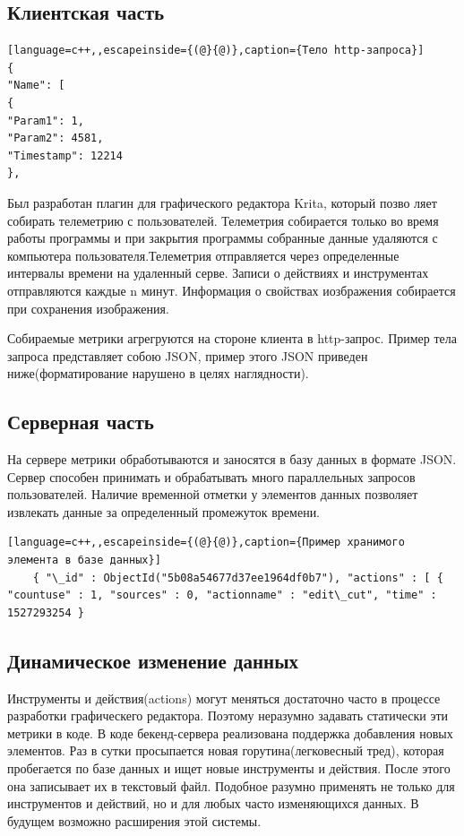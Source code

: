 \subsection{Клиентская часть}
\begin{lstlisting}[language=c++,,escapeinside={(@}{@)},caption={Тело http-запроса}] 
{
"Name": [
{
"Param1": 1,
"Param2": 4581,
"Timestamp": 12214
},
\end{lstlisting}
Был разработан плагин для графического редактора Krita, который позво­
ляет собирать телеметрию с пользователей. Телеметрия собирается только во время работы программы и при закрытия программы собранные данные удаляются с компьютера пользователя.Телеметрия отправляется через опре­деленные интервалы времени на удаленный серве. Записи о действиях и инстру­ментах отправляются каждые n минут.	   Информация о свойствах иозбражения собирается при сохранения изображения. 


Собираемые метрики агрегруются на стороне клиента в http-запрос. Пример тела запроса представляет собою JSON, пример этого JSON приведен ниже(форматирование нарушено в целях наглядности).

\subsection{Серверная часть}
На сервере метрики обработываются и заносятся в базу данных в формате JSON. Сервер способен принимать и обрабатывать много параллельных запросов пользователей.
Наличие временной отметки  у элементов данных позволяет извлекать данные за определенный промежуток времени.
	\begin{lstlisting}[language=c++,,escapeinside={(@}{@)},caption={Пример хранимого элемента в базе данных}] 
	{ "\_id" : ObjectId("5b08a54677d37ee1964df0b7"), "actions" : [ { "countuse" : 1, "sources" : 0, "actionname" : "edit\_cut", "time" : 1527293254 }
	\end{lstlisting}

\subsection{Динамическое изменение данных}
Инструменты и действия(actions) могут меняться достаточно часто в про­цессе разработки графическего редактора. Поэтому неразумно задавать статически
эти метрики в коде. В коде бекенд-сервера реализована поддержка добавления но­вых элементов. Раз в сутки просыпается новая горутина(легковесный тред), которая пробегается по базе данных и ищет новые инструменты и действия. После этого она записывает их в текстовый файл. Подобное разумно применять не только для инструментов и действий, но и для любых часто изменяющихся данных.  В будущем возможно расширения этой системы.